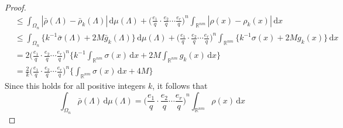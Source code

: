 \documentclass[11pt]{article}
\theoremstyle{definition}
\theoremstyle{proof}
\begin{document}
\begin{proof}
\begin{equation*}
\begin{split}
            & \leq \int_{{\Omega}_n} |\bar{\rho } (\Lambda ) - \bar{\rho }_k (\Lambda )| \, \mathrm{d} \mu (\Lambda ) + {\bigg(\frac{e_1}{q} \cdot \frac{e_2}{q} \cdots \frac{e_r}{q} \bigg)}^n \int_{\mathbb{R}^{nm}} |\rho (x) - \rho _k(x)| \, \mathrm{d} x \\
            & \leq \int_{{\Omega}_n} \big\{k^{-1} \bar{\sigma }(\Lambda ) + 2M \bar{g}_k (\Lambda ) \big\} \, \mathrm{d} \mu (\Lambda ) + {\bigg(\frac{e_1}{q} \cdot \frac{e_2}{q} \cdots \frac{e_r}{q} \bigg)}^n \int_{\mathbb{R}^{nm}} \big\{k^{-1} \sigma (x) + 2M g_k (x) \big\} \, \mathrm{d} x \\
            &= 2{\bigg(\frac{e_1}{q} \cdot \frac{e_2}{q} \cdots \frac{e_r}{q} \bigg)}^n \Bigg\{k^{-1} \int_{\mathbb{R}^{nm}} \sigma (x) \, \mathrm{d} x + 2M \int_{\mathbb{R}^{nm}} g_k(x) \, \mathrm{d} x \Bigg\} \\
            &= \frac{2}{k} {\bigg(\frac{e_1}{q} \cdot \frac{e_2}{q} \cdots \frac{e_r}{q} \bigg)}^n \Bigg\{\int_{\mathbb{R}^{nm}} \sigma (x) \, \mathrm{d} x + 4M \Bigg\}
        \end{split}
    \end{equation*}
    Since this holds for all positive integers $k$, it follows that
    \[
        \int_{{\Omega}_n} \bar{\rho } (\Lambda ) \, \mathrm{d} \mu (\Lambda ) = {\bigg(\frac{e_1}{q} \cdot \frac{e_2}{q} \cdots \frac{e_r}{q} \bigg)}^n \int_{\mathbb{R}^{nm}} \rho (x) \, \mathrm{d} x
    \]


\end{proof}
\end{document}
